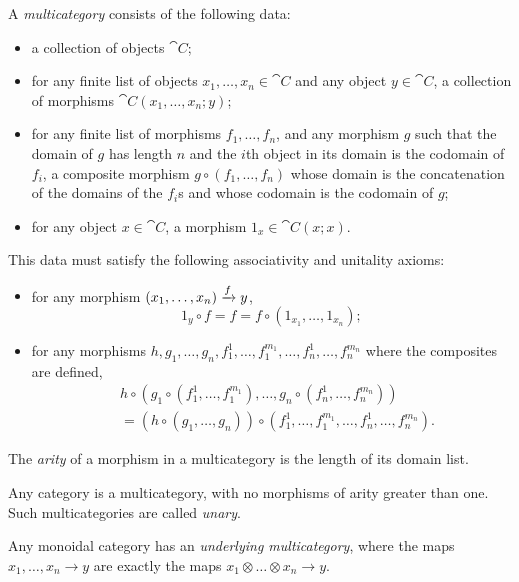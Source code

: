 \begin{dfn}[multicategory]\label{def:multicategory}
  A \emph{multicategory} consists of the following data:
  \begin{itemize}
    \item a collection of objects $\cat{C}$;
    \item for any finite list of objects $x_1, \dots, x_n\in\cat{C}$ and any
      object $y\in\cat{C}$, a collection of morphisms $\cat{C}(x_1,\dots,x_n;y)$;
    \item for any finite list of morphisms $f_1,\dots,f_n$, and any morphism
      $g$ such that the domain of $g$ has length $n$ and the $i$th object in
      its domain is the codomain of $f_i$, a composite morphism
      $g\circ(f_1,\dots,f_n)$ whose domain is the concatenation of the domains
      of the $f_i$s and whose codomain is the codomain of $g$;
    \item for any object $x\in\cat{C}$, a morphism $1_x\in\cat{C}(x;x)$.
  \end{itemize}
  This data must satisfy the following associativity and unitality axioms:
  \begin{itemize}
    \item for any morphism $(x_1,\dots,x_n)\xrightarrow{f} y$, \[
        1_y\circ f = f = f\circ(1_{x_1},\dots,1_{x_n});
      \]
    \item for any morphisms
      $h,g_1,\dots,g_n,f_1^1,\dots,f_1^{m_1},\dots,f_n^1,\dots,f_n^{m_n}$ where
      the composites are defined,
      \begin{align*}
      &h\circ(g_1\circ(f_1^1,\dots,f_1^{m_1}),\dots,g_n\circ(f_n^1,\dots,f_n^{m_n})) \\
      &= (h\circ(g_1,\dots,g_n))\circ(f_1^1,\dots,f_1^{m_1},\dots,f_n^1,\dots,f_n^{m_n}).
      \end{align*}
  \end{itemize}
\end{dfn}

\begin{ntn}
  The \emph{arity} of a morphism in a multicategory is the length of its domain
  list.
\end{ntn}

\begin{ex}
  Any category is a multicategory, with no morphisms of arity greater
  than one. Such multicategories are called \emph{unary}.
\end{ex}

\begin{ex}
  Any monoidal category has an \emph{underlying multicategory}, where the maps
  $x_1,\dots,x_n\to y$ are exactly the maps $x_1\otimes\dots\otimes x_n\to y$.
\end{ex}

